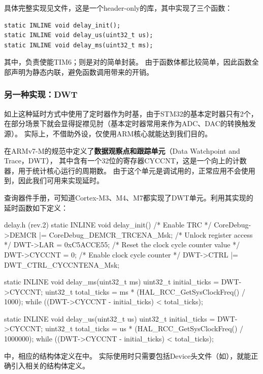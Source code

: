具体完整实现见文件，这是一个header-only的库，其中实现了三个函数：

\begin{verbatim}
static INLINE void delay_init();
static INLINE void delay_us(uint32_t us);
static INLINE void delay_ms(uint32_t ms);
\end{verbatim}

其中，负责使能TIM6；则是对的简单封装。
由于函数体都比较简单，因此函数全部声明为静态内联，避免函数调用带来的开销。

\subsubsection{另一种实现：DWT}

如上这种延时方式中使用了定时器作为时基，由于STM32的基本定时器只有2个，
在部分场景下就会显得捉襟见肘（基本定时器常用来作为ADC、DAC的转换触发源）。
实际上，不借助外设，仅使用ARM核心就能达到我们目的。

在ARMv7-M的规范中定义了\textbf{数据观察点和跟踪单元}（Data Watchpoint and Trace，DWT），
其中含有一个32位的寄存器CYCCNT，这是一个向上的计数器，用于统计核心运行的周期数。
由于这个单元是调试用的，正常应用不会使用到，因此我们可用来实现延时。

查询器件手册，可知道Cortex-M3、M4、M7都实现了DWT单元。利用其实现的延时函数如下定义：

\begin{cbox}{delay.h (rev.2)}
  static INLINE void
  delay_init()
  {
    /* Enable TRC */
    CoreDebug->DEMCR |= CoreDebug_DEMCR_TRCENA_Msk;
    /* Unlock register access */
    DWT->LAR = 0xC5ACCE55;
    /* Reset the clock cycle counter value */
    DWT->CYCCNT = 0;
    /* Enable clock cycle counter */
    DWT->CTRL |= DWT_CTRL_CYCCNTENA_Msk;
  }

  static INLINE void
  delay_ms(uint32_t ms)
  {
    uint32_t initial_ticks = DWT->CYCCNT;
    uint32_t total_ticks = ms * (HAL_RCC_GetSysClockFreq() / 1000);
    while ((DWT->CYCCNT - initial_ticks) < total_ticks);
  }

  static INLINE void
  delay_us(uint32_t us)
  {
    uint32_t initial_ticks = DWT->CYCCNT;
    uint32_t total_ticks = us * (HAL_RCC_GetSysClockFreq() / 1000000);
    while ((DWT->CYCCNT - initial_ticks) < total_ticks);
  }
\end{cbox}

中，相应的结构体定义在中。
实际使用时只需要包括Device头文件（如），就能正确引入相关的结构体定义。

